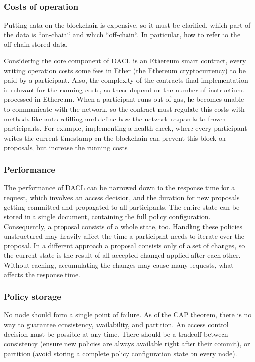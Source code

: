\documentclass[12pt, conference]{IEEEtran}
\begin{document}
\subsubsection{Costs of operation}

Putting data on the blockchain is expensive, so it must be clarified, which part of the data is ``on-chain`` and which ``off-chain``. In particular, how to refer to the off-chain-stored data. 

Considering the core component of DACL is an Ethereum smart contract, every writing operation costs some fees in Ether (the Ethereum cryptocurrency) to be paid by a participant. Also, the complexity of the contracts final implementation is relevant for the running costs, as these depend on the number of instructions processed in Ethereum. When a participant runs out of gas, he becomes unable to communicate with the network, so the contract must regulate this costs with methods like auto-refilling and define how the network responds to frozen participants. For example, implementing a health check, where every participant writes the current timestamp on the blockchain can prevent this block on proposals, but increase the running costs.

\subsubsection{Performance}

The performance of DACL can be narrowed down to the response time for a request, which involves an access decision, and the duration for new proposals getting committed and propagated to all participants. The entire state can be stored in a single document, containing the full policy configuration. Consequently, a proposal consists of a whole state, too. Handling these policies unstructured may heavily affect the time a participant needs to iterate over the proposal. In a different approach a proposal consists only of a set of changes, so the current state is the result of all accepted changed applied after each other. Without caching, accumulating the changes may cause many requests, what affects the response time.

\subsubsection{Policy storage}

No node should form a single point of failure. As of the CAP theorem, there is no way to guarantee consistency, availability, and partition. An access control decision must be possible at any time. There should be a tradeoff between consistency (ensure new policies are always available right after their commit), or partition (avoid storing a complete policy configuration state on every node).
\end{document}
